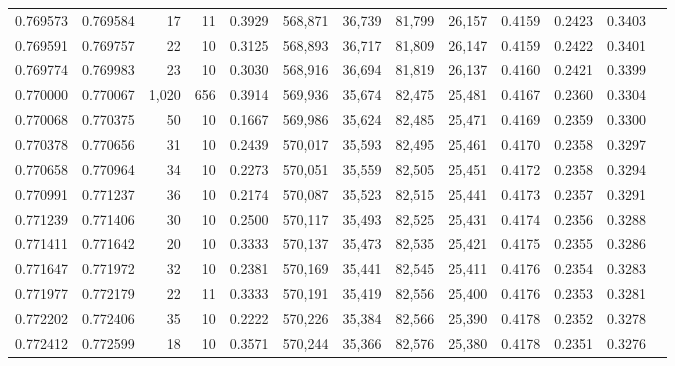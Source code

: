 \begin{tabular}{rrrrrrrrrrrrr}
0.769573 & 0.769584 &    17 &  11 &                                     0.3929 & 568,871 &  36,739 &  81,799 &  26,157 & 0.4159 & 0.2423 & 0.3403 \\
0.769591 & 0.769757 &    22 &  10 &                                     0.3125 & 568,893 &  36,717 &  81,809 &  26,147 & 0.4159 & 0.2422 & 0.3401 \\
0.769774 & 0.769983 &    23 &  10 &                                     0.3030 & 568,916 &  36,694 &  81,819 &  26,137 & 0.4160 & 0.2421 & 0.3399 \\
0.770000 & 0.770067 & 1,020 & 656 &                                     0.3914 & 569,936 &  35,674 &  82,475 &  25,481 & 0.4167 & 0.2360 & 0.3304 \\
0.770068 & 0.770375 &    50 &  10 &                                     0.1667 & 569,986 &  35,624 &  82,485 &  25,471 & 0.4169 & 0.2359 & 0.3300 \\
0.770378 & 0.770656 &    31 &  10 &                                     0.2439 & 570,017 &  35,593 &  82,495 &  25,461 & 0.4170 & 0.2358 & 0.3297 \\
0.770658 & 0.770964 &    34 &  10 &                                     0.2273 & 570,051 &  35,559 &  82,505 &  25,451 & 0.4172 & 0.2358 & 0.3294 \\
0.770991 & 0.771237 &    36 &  10 &                                     0.2174 & 570,087 &  35,523 &  82,515 &  25,441 & 0.4173 & 0.2357 & 0.3291 \\
0.771239 & 0.771406 &    30 &  10 &                                     0.2500 & 570,117 &  35,493 &  82,525 &  25,431 & 0.4174 & 0.2356 & 0.3288 \\
0.771411 & 0.771642 &    20 &  10 &                                     0.3333 & 570,137 &  35,473 &  82,535 &  25,421 & 0.4175 & 0.2355 & 0.3286 \\
0.771647 & 0.771972 &    32 &  10 &                                     0.2381 & 570,169 &  35,441 &  82,545 &  25,411 & 0.4176 & 0.2354 & 0.3283 \\
0.771977 & 0.772179 &    22 &  11 &                                     0.3333 & 570,191 &  35,419 &  82,556 &  25,400 & 0.4176 & 0.2353 & 0.3281 \\
0.772202 & 0.772406 &    35 &  10 &                                     0.2222 & 570,226 &  35,384 &  82,566 &  25,390 & 0.4178 & 0.2352 & 0.3278 \\
0.772412 & 0.772599 &    18 &  10 &                                     0.3571 & 570,244 &  35,366 &  82,576 &  25,380 & 0.4178 & 0.2351 & 0.3276 \\

\end{tabular}
